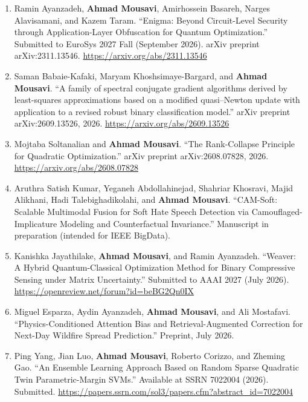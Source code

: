 \documentclass[letterpaper,11pt]{article}
\newcommand{\resheading}[1]{\par\vspace{0.6em}\noindent{\large\textbf{#1}}\par\vspace{0.25em}}
\begin{document}
\resheading{\large{Submitted and Non-Peer-Reviewed Manuscripts}}
\begin{enumerate}

\item[15.] Ramin Ayanzadeh, \textbf{Ahmad Mousavi}, Amirhossein Basareh, Narges Alavisamani, and Kazem Taram. ``Enigma: Beyond Circuit-Level Security through Application-Layer Obfuscation for Quantum Optimization.'' Submitted to EuroSys 2027 Fall (September 2026). arXiv preprint arXiv:2311.13546. \url{https://arxiv.org/abs/2311.13546}

\item[14.] Saman Babaie-Kafaki, Maryam Khoshsimaye-Bargard, and \textbf{Ahmad Mousavi}. ``A family of spectral conjugate gradient algorithms derived by least-squares approximations based on a modified quasi--Newton update with application to a revised robust binary classification model.'' arXiv preprint arXiv:2609.13526, 2026. \url{https://arxiv.org/abs/2609.13526}

\item[12.] Mojtaba Soltanalian and \textbf{Ahmad Mousavi}. ``The Rank-Collapse Principle for Quadratic Optimization.'' arXiv preprint arXiv:2608.07828, 2026. \url{https://arxiv.org/abs/2608.07828}

\item[11.] Aruthra Satish Kumar, Yeganeh Abdollahinejad, Shahriar Khosravi, Majid Alikhani, Hadi Talebighadikolahi, and \textbf{Ahmad Mousavi}. ``CAM-Soft: Scalable Multimodal Fusion for Soft Hate Speech Detection via Camouflaged-Implicature Modeling and Counterfactual Invariance.'' Manuscript in preparation (intended for IEEE BigData).

\item[10.] Kanishka Jayathilake, \textbf{Ahmad Mousavi}, and Ramin Ayanzadeh. ``Weaver: A Hybrid Quantum-Classical Optimization Method for Binary Compressive Sensing under Matrix Uncertainty.'' Submitted to AAAI 2027 (July 2026). \url{https://openreview.net/forum?id=beBG2Qn0IX}

\item[9.] Miguel Esparza, Aydin Ayanzadeh, \textbf{Ahmad Mousavi}, and Ali Mostafavi. ``Physics-Conditioned Attention Bias and Retrieval-Augmented Correction for Next-Day Wildfire Spread Prediction.'' Preprint, July 2026.

\item[8.] Ping Yang, Jian Luo, \textbf{Ahmad Mousavi}, Roberto Corizzo, and Zheming Gao. ``An Ensemble Learning Approach Based on Random Sparse Quadratic Twin Parametric-Margin SVMs.'' Available at SSRN 7022004 (2026). Submitted.
\url{https://papers.ssrn.com/sol3/papers.cfm?abstract_id=7022004}


\end{enumerate}
\end{document}
